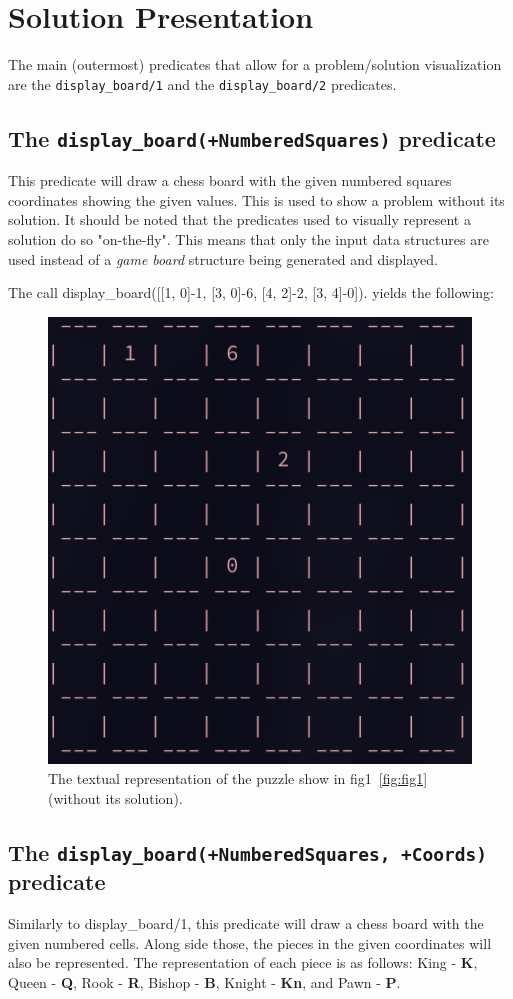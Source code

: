 \documentclass[runningheads]{llncs}
\newcommand{\inlinecode}[1]{\texttt{#1}}
\begin{document}
\section{Solution Presentation}

The main (outermost) predicates that allow for a problem/solution visualization
are the \inlinecode{display\_board/1} and the \inlinecode{display\_board/2} predicates.

\subsection{The \inlinecode{display\_board(+NumberedSquares)} predicate}

This predicate will draw a chess board with the given numbered squares coordinates
showing the given values. This is used to show a problem without its solution. It
should be noted that the predicates used to visually represent a solution do so
"on-the-fly". This means that only the input data structures are used instead of
a \textit{game board} structure being generated and displayed.

The call display\_board([[1, 0]-1, [3, 0]-6, [4, 2]-2, [3, 4]-0]). yields the
following:
\begin{figure}[H]
  \centering
  \includegraphics[width=0.5\linewidth]{figures/display_board_1.png}
  \caption{The textual representation of the puzzle show in fig1~\ref{fig:fig1}
  (without its solution).}\label{fig2}
\end{figure}

\subsection{The \inlinecode{display\_board(+NumberedSquares, +Coords)} predicate}

Similarly to display\_board/1, this predicate will draw a chess board with the given
numbered cells. Along side those, the pieces in the given coordinates will also be
represented. The representation of each piece is as follows: King - \textbf{K},
Queen - \textbf{Q}, Rook - \textbf{R}, Bishop - \textbf{B}, Knight - \textbf{Kn},
and Pawn - \textbf{P}.
\end{document}

